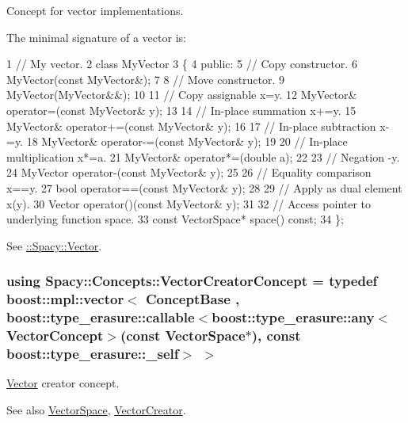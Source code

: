 Concept for vector implementations. 

\label{group__ConceptGroup_gad6958389d1fa2758a8a64a0a24c36004_VectorConceptAnchor}%
\hypertarget{group__ConceptGroup_gad6958389d1fa2758a8a64a0a24c36004_VectorConceptAnchor}{}%
The minimal signature of a vector is\+: 
\begin{DoxyCode}
1 // My vector.
2 class MyVector
3 \{
4 public:
5   // Copy constructor.
6   MyVector(const MyVector&);
7 
8   // Move constructor.
9   MyVector(MyVector&&);
10 
11   // Copy assignable x=y.
12   MyVector& operator=(const MyVector& y);
13 
14   // In-place summation x+=y.
15   MyVector& operator+=(const MyVector& y);
16 
17   // In-place subtraction x-=y.
18   MyVector& operator-=(const MyVector& y);
19 
20   // In-place multiplication x*=a.
21   MyVector& operator*=(double a);
22 
23   // Negation -y.
24   MyVector operator-(const MyVector& y);
25 
26   // Equality comparison x==y.
27   bool operator==(const MyVector& y);
28 
29   // Apply as dual element x(y).
30   Vector operator()(const MyVector& y);
31 
32   // Access pointer to underlying function space.
33   const VectorSpace* space() const;
34 \};
\end{DoxyCode}


See \hyperlink{group__SpacyGroup_gafc144d2730ef87a67e54f8cd750b1f54_VectorAnchor}{\+:\+:Spacy\+:\+:Vector}. \hypertarget{group__ConceptGroup_ga3064301642b7c66b1b08f88a12a04645_ga3064301642b7c66b1b08f88a12a04645}{}
\subsubsection[{Vector\+Creator\+Concept}]{\setlength{\rightskip}{0pt plus 5cm}using {\bf Spacy\+::\+Concepts\+::\+Vector\+Creator\+Concept} = typedef boost\+::mpl\+::vector$<$ Concept\+Base , boost\+::type\+\_\+erasure\+::callable$<$boost\+::type\+\_\+erasure\+::any$<$Vector\+Concept$>$(const Vector\+Space$\ast$), const boost\+::type\+\_\+erasure\+::\+\_\+self$>$ $>$}\label{group__ConceptGroup_ga3064301642b7c66b1b08f88a12a04645_ga3064301642b7c66b1b08f88a12a04645}


\hyperlink{classSpacy_1_1Vector}{Vector} creator concept. 

\label{group__ConceptGroup_ga3064301642b7c66b1b08f88a12a04645_VectorCreatorConceptAnchor}%
\hypertarget{group__ConceptGroup_ga3064301642b7c66b1b08f88a12a04645_VectorCreatorConceptAnchor}{}%
\begin{DoxySeeAlso}{See also}
\hyperlink{classSpacy_1_1VectorSpace}{Vector\+Space}, \hyperlink{group__SpacyGroup_ga1f5316487c031a478247206764bb2efb_VectorCreatorAnchor}{Vector\+Creator}. 
\end{DoxySeeAlso}
